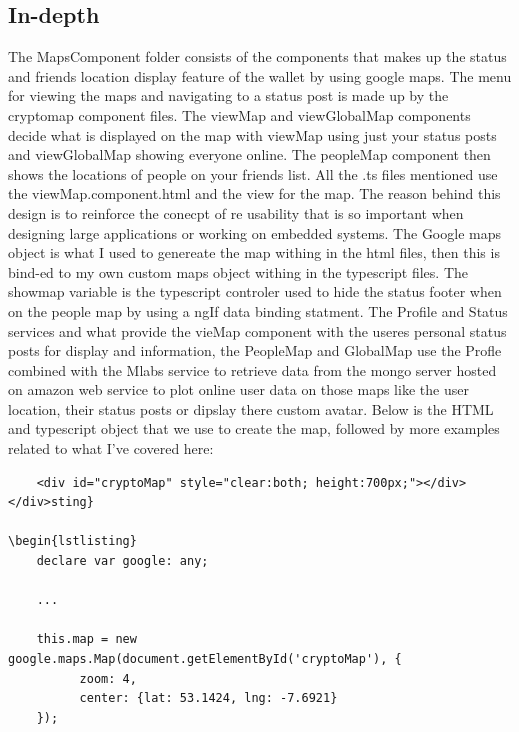 \subsection{In-depth}
The MapsComponent folder consists of the components that makes up the status and friends location display feature of the wallet by using google maps. The menu for viewing the maps and navigating to a status post is made up by the cryptomap component files. The viewMap and viewGlobalMap components decide what is displayed on the map with viewMap using just your status posts and viewGlobalMap showing everyone online. The peopleMap component then shows the locations of people on your friends list. All the .ts files mentioned use the viewMap.component.html and the view for the map. The reason behind this design is to reinforce the conecpt of re usability that is so important when designing large applications or working on embedded systems. The Google maps object is what I used to genereate the map withing in the html files, then this is bind-ed to my own custom maps object withing in the typescript files. The showmap variable is the typescript controler used to hide the status footer when on the people map by using a ngIf data binding statment. The Profile and Status services and what provide the vieMap component with the useres personal status posts for display and information, the PeopleMap and GlobalMap use the Profle combined with the Mlabs service to retrieve data from the mongo server hosted on amazon web service to plot online user data on those maps like the user location, their status posts or dipslay there custom avatar. Below is the HTML and typescript object that we use to create the map, followed by more examples related to what I've covered here:

\begin{lstlisting}
    <div id="cryptoMap" style="clear:both; height:700px;"></div>
</div>sting}

\begin{lstlisting}
    declare var google: any;

    ...
    
    this.map = new google.maps.Map(document.getElementById('cryptoMap'), {
          zoom: 4,
          center: {lat: 53.1424, lng: -7.6921}
    });
\end{lstlisting}

